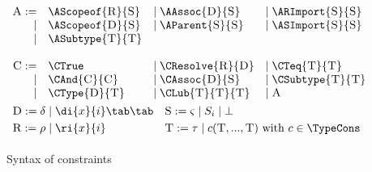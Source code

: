 
\begin{figure}[t]
\begin{boxedminipage}{\hsize}
  \begin{align*}
& \begin{array}{rlll}
  \sort{A} := & \AScopeof{\sort{R}}{\sort{S}} 
  & \mid \AAssoc{\sort{D}}{\sort{S}}  
  & \mid \ARImport{\sort{S}}{\sort{S}}\\ 
  \mid & \AScopeof{\sort{D}}{\sort{S}}
  & \mid \AParent{\sort{S}}{\sort{S}} 
  & \mid \ASImport{\sort{S}}{\sort{S}} \\
  \mid & \ASubtype{\sort{T}}{\sort{T}} \\
  \\
  \sort{C} := & \CTrue
  & \mid \CResolve{\sort{R}}{\sort{D}} 
  & \mid \CTeq{\sort{T}}{\sort{T}} \\
  \mid & \CAnd{\sort{C}}{\sort{C}} 
  & \mid \CAssoc{\sort{D}}{\sort{S}}
  & \mid \CSubtype{\sort{T}}{\sort{T}} \\
  \mid & \CType{\sort{D}}{\sort{T}} 
  & \mid \CLub{\sort{T}}{\sort{T}}{\sort{T}}
  & \mid \sort{A}
\end{array}\\
& \begin{array}{rlllrllll} 
\multicolumn{2}{l}{\sort{D} :=  \delta  \mid \di{x}{i}\tab \tab} 
& \multicolumn{6}{l}{\sort{S} := \varsigma  \mid S_i \mid \bot }
\smallskip\\
\multicolumn{2}{l}{\sort{R} := \rho \mid \ri{x}{i}} 
& \multicolumn{6}{l}{\sort{T} := \tau \mid
c({\sort{T},...,\sort{T}}) \hbox{ with } c \in \TypeCons}\smallskip\\
\end{array}
\end{align*}
\end{boxedminipage}
  \caption{Syntax of constraints}
  \label{fig:constraintsyntax}
\end{figure}

